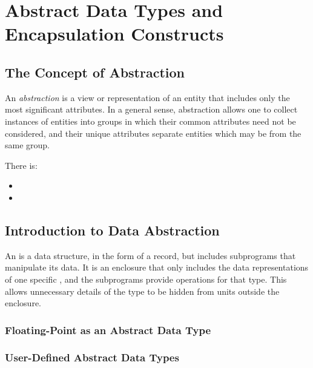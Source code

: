 \section{Abstract Data Types and Encapsulation Constructs}\label{sec:Abstract_Data_Types_Encapsulation_Constructs}
\subsection{The Concept of Abstraction}\label{subsec:Concept_Abstraction}
\begin{definition}[Abstraction]\label{def:Abstraction}
  An \emph{abstraction} is a view or representation of an entity that includes only the most significant attributes.
  In a general sense, abstraction allows one to collect instances of entities into groups in which their common attributes need not be considered, and their unique attributes separate entities which may be from the same group.

  There is:
  \begin{itemize}[noitemsep]
  \item {}
  \item {}
  \end{itemize}
\end{definition}

\subsection{Introduction to Data Abstraction}\label{subsec:Intro_Data_Abstraction}
An \emph{} is a data structure, in the form of a record, but includes subprograms that manipulate its data.
It is an enclosure that only includes the data representations of one specific , and the subprograms provide operations for that type.
This allows unnecessary details of the type to be hidden from units outside the enclosure.

\subsubsection{Floating-Point as an Abstract Data Type}\label{subsubsec:Floating_Point_Abstract_Data_Type}
\subsubsection{User-Defined Abstract Data Types}\label{subsubsec:User_Defined_Abstract_Data_Types}

